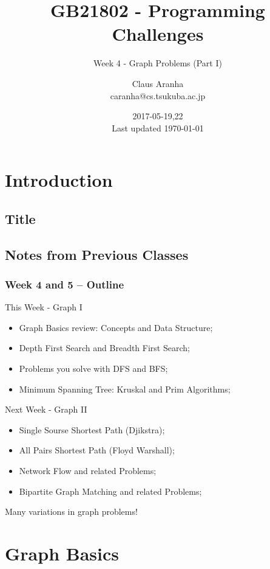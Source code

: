 \documentclass{beamer}
\title[GB21802]{GB21802 - Programming Challenges}
\subtitle[]{Week 4 - Graph Problems (Part I)}
\author[Claus Aranha]{Claus Aranha\\{\footnotesize caranha@cs.tsukuba.ac.jp}}
\institute{College of Information Science}
\date{2017-05-19,22\\{\tiny Last updated \today}}
\begin{document}
\section{Introduction}
\subsection{Title}
\begin{frame}
\maketitle
\end{frame}

\subsection{Notes from Previous Classes}



\begin{frame}
  \frametitle{Week 4 and 5 -- Outline}
  {\smaller
  \begin{block}{This Week - Graph I}
    \begin{itemize}
    \item Graph Basics review: Concepts and Data Structure;
    \item Depth First Search and Breadth First Search;
    \item Problems you solve with DFS and BFS;
    \item Minimum Spanning Tree: Kruskal and Prim Algorithms;
    \end{itemize}
  \end{block}
  \begin{block}{Next Week - Graph II}
    \begin{itemize}
    \item Single Sourse Shortest Path (Djikstra);
    \item All Pairs Shortest Path (Floyd Warshall);   
    \item Network Flow and related Problems;
    \item Bipartite Graph Matching and related Problems;
    \end{itemize}
  \end{block}}
  Many variations in graph problems!
\end{frame}

\section{Graph Basics}
\end{document}
